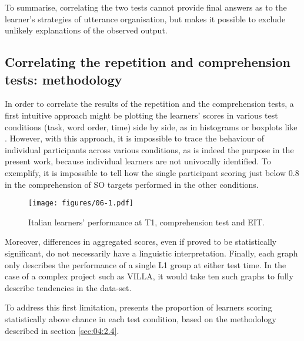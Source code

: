 To summarise, correlating the two tests cannot provide final answers as to the learner's strategies of utterance organisation, but makes it possible to exclude unlikely explanations of the observed output.

\subsection{Correlating the repetition and comprehension tests: methodology}\label{sec:06:2.1}

In order to correlate the results of the repetition and the comprehension tests, a first intuitive approach might be plotting the learners' scores in various test conditions (task, word order, time) side by side, as in histograms or boxplots like . However, with this approach, it is impossible to trace the behaviour of individual participants across various conditions, as is indeed the purpose in the present work, because individual learners are not univocally identified. To exemplify, it is impossible to tell how the single participant scoring just below 0.8 in the comprehension of SO targets performed in the other conditions.  

\begin{figure}
    \texttt{[image: figures/06-1.pdf]}
    \caption{Italian learners’ performance at T1, comprehension test and EIT.}
    \label{fig:06:1}
\end{figure}

Moreover, differences in aggregated scores, even if proved to be statistically significant, do not necessarily have a linguistic interpretation. Finally, each graph only describes the performance of a single L1 group at either test time. In the case of a complex project such as VILLA, it would take ten such graphs to fully describe tendencies in the data-set.

To address this first limitation,  presents the proportion of learners scoring statistically above chance in each test condition, based on the methodology described in section \ref{sec:04:2.4}. 

